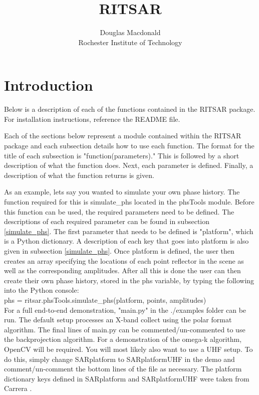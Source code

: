\documentclass{article}
\title{RITSAR}
\author{Douglas Macdonald\\[2ex]
		Rochester Institute of Technology}
\begin{document}
\maketitle
\tableofcontents
\newpage

\section{Introduction}
Below is a description of each of the functions contained in the RITSAR package.  For installation instructions, reference the README file.  

Each of the sections below represent a module contained within the RITSAR package and each subsection details how to use each function.  The format for the title of each subsection is "function(parameters)."  This is followed by a short description of what the function does. Next, each parameter is defined.  Finally, a description of what the function returns is given.

As an example, lets say you wanted to simulate your own phase history.  The function required for this is simulate\_phs located in the phsTools module.  Before this function can be used, the required parameters need to be defined.  The descriptions of each required parameter can be found in subsection \ref{simulate_phs}.  The first parameter that needs to be defined is "platform", which is a Python dictionary. A description of each key that goes into platform is also given in subsection \ref{simulate_phs}.  Once platform is defined, the user then creates an array specifying the locations of each point reflector in the scene as well as the corresponding amplitudes.  After all this is done the user can then create their own phase history, stored in the phs variable, by typing the following into the Python console:\\[2ex]phs = ritsar.phsTools.simulate\_phs(platform, points, amplitudes)\\[2ex]  For a full end-to-end demonstration, "main.py" in the ./examples folder can be run.  The default setup processes an X-band collect using the polar format algorithm.  The final lines of main.py can be commented/un-commented to use the backprojection algorithm.  For a demonstration of the omega-k algorithm, OpenCV will be required.  You will most likely also want to use a UHF setup.  To do this, simply change SARplatform to SARplatformUHF in the demo and comment/un-comment the bottom lines of the file as necessary.  The platform dictionary keys defined in SARplatform and SARplatformUHF were taken from Carrera \cite{Carrera}.\newpage
\end{document}
